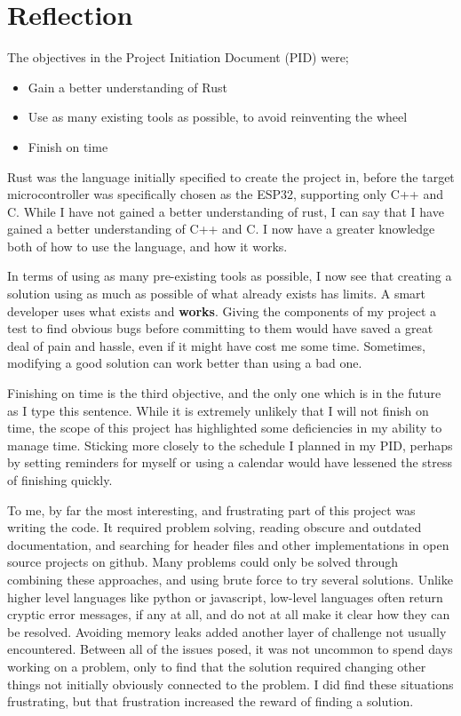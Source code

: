 \documentclass{article}
\begin{document}
\section{Reflection}

The objectives in the Project Initiation Document (PID) were;
\begin{itemize}
\item Gain a better understanding of Rust
\item Use as many existing tools as possible, to avoid reinventing the wheel
\item Finish on time
\end{itemize}

Rust was the language initially specified to create the project in, before the target microcontroller was specifically chosen as the ESP32, supporting only C++ and C. While I have not gained a better understanding of rust, I can say that I have gained a better understanding of C++ and C. I now have a greater knowledge both of how to use the language, and how it works.

In terms of using as many pre-existing tools as possible, I now see that creating a solution using as much as possible of what already exists has limits. A smart developer uses what exists and \textbf{works}. Giving the components of my project a test to find obvious bugs before committing to them would have saved a great deal of pain and hassle, even if it might have cost me some time. Sometimes, modifying a good solution can work better than using a bad one.

Finishing on time is the third objective, and the only one which is in the future as I type this sentence. While it is extremely unlikely that I will not finish on time, the scope of this project has highlighted some deficiencies in my ability to manage time. Sticking more closely to the schedule I planned in my PID, perhaps by setting reminders for myself or using a calendar would have lessened the stress of finishing quickly.

To me, by far the most interesting, and frustrating part of this project was writing the code. It required problem solving, reading obscure and outdated documentation, and searching for header files and other implementations in open source projects on github. Many problems could only be solved through combining these approaches, and using brute force to try several solutions. Unlike higher level languages like python or javascript, low-level languages often return cryptic error messages, if any at all, and do not at all make it clear how they can be resolved. Avoiding memory leaks added another layer of challenge not usually encountered. Between all of the issues posed, it was not uncommon to spend days working on a problem, only to find that the solution required changing other things not initially obviously connected to the problem. I did find these situations frustrating, but that frustration increased the reward of finding a solution.
\end{document}
